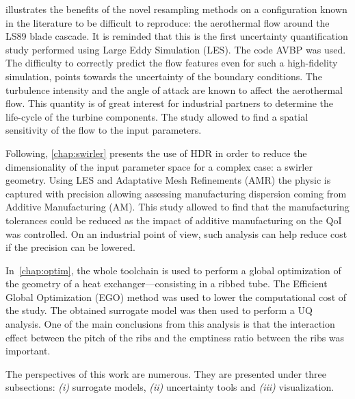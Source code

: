  illustrates the benefits of the novel resampling methods on a configuration known in the literature to be difficult to reproduce: the aerothermal flow around the LS89 blade cascade. It is reminded that this is the first uncertainty quantification study performed using Large Eddy Simulation (LES). The code AVBP was used. The difficulty to correctly predict the flow features even for such a high-fidelity simulation, points towards the uncertainty of the boundary conditions. The turbulence intensity and the angle of attack are known to affect the aerothermal flow. This quantity is of great interest for industrial partners to determine the life-cycle of the turbine components. The study allowed to find a spatial sensitivity of the flow to the input parameters.

Following, \cref{chap:swirler} presents the use of HDR in order to reduce the dimensionality of the input parameter space for a complex case: a swirler geometry. Using LES and Adaptative Mesh Refinements (AMR) the physic is captured with precision allowing assessing manufacturing dispersion coming from Additive Manufacturing (AM). This study allowed to find that the manufacturing tolerances could be reduced as the impact of additive manufacturing on the QoI was controlled. On an industrial point of view, such analysis can help reduce cost if the precision can be lowered.

 In~\cref{chap:optim}, the whole toolchain is used to perform a global optimization of the geometry of a heat exchanger---consisting in a ribbed tube. The Efficient Global Optimization (EGO) method was used to lower the computational cost of the study. The obtained surrogate model was then used to perform a UQ analysis. One of the main conclusions from this analysis is that the interaction effect between the pitch of the ribs and the emptiness ratio between the ribs was important. %


The perspectives of this work are numerous. They are presented under three subsections: \emph{(i)} surrogate models, \emph{(ii)} uncertainty tools and \emph{(iii)} visualization.


